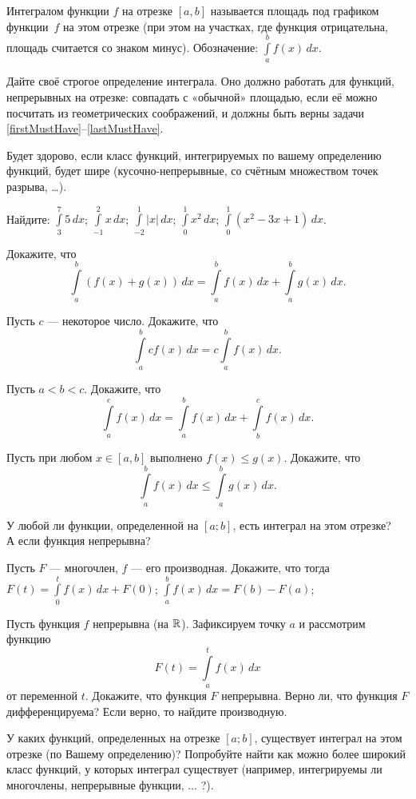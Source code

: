 \documentclass[a4paper,12pt]{article}
\newcommand{\intab}{\int\limits_a^b}
\begin{document}

Интегралом функции $f$ на отрезке $[a,b]$
называется площадь под графиком функции~$f$ на этом отрезке
(при этом на участках, где функция отрицательна, площадь
считается со знаком  минус).
Обозначение: $\int\limits_{a}^{b} f(x)\,dx$.

Дайте своё строгое определение интеграла.
Оно должно работать для функций, непрерывных на отрезке: 
совпадать с «обычной» площадью, если её можно посчитать из геометрических соображений, и должны быть верны задачи \ref{firstMustHave}--\ref{lastMustHave}.

Будет здорово, если класс функций, интегрируемых по вашему определению функций, будет шире (кусочно-непрерывные, со счётным множеством точек разрыва, \dots).

Найдите:
$\displaystyle\int\limits_{3}^{7} 5\,dx$;
$\displaystyle\int\limits_{-1}^{2} x\,dx$;
$\displaystyle\int\limits_{-2}^{1} |x|\,dx$;
$\displaystyle\int\limits_{0}^{1} x^2\,dx$;
$\displaystyle\int\limits_{0}^{1} (x^2-3x+1)\,dx$.


\label{firstMustHave}
Докажите, что
$$
\int\limits_a^b(f(x)+g(x))\,dx=
\int\limits_a^bf(x)\,dx+\int\limits_a^bg(x)\,dx.
$$

Пусть $c$ --- некоторое число.
Докажите, что
$$
\int\limits_a^bcf(x)\,dx  = c\int\limits_a^bf(x)\,dx.
$$

 Пусть  $a<b<c$. Докажите, что
$$
\int\limits_a^c f(x)\,dx=\int\limits_a^b f(x)\,dx+\int\limits_b^c f(x)\,dx.
$$


 Пусть при любом $x\in[a,b]$ выполнено $f(x)\le g(x)$.
Докажите, что
$$
\intab f(x)\,dx \le \intab g(x)\,dx.
$$

У любой ли функции, определенной на $[a;b]$, есть интеграл на этом
отрезке?\\
А если функция непрерывна?

\label{lastMustHave}
Пусть $F$ --- многочлен, $f$ --- его производная. Докажите,
что тогда\\
$F(t)=\int\limits_0^tf(x)\, dx+F(0)$;
$\int\limits_a^bf(x)\, dx=F(b)-F(a)$;

Пусть функция $f$ непрерывна (на $\mathbb{R}$). Зафиксируем точку $a$
и рассмотрим функцию $$F(t)=\int\limits_a^tf(x)\, dx$$ от переменной $t$.
Докажите, что функция $F$ непрерывна.
Верно ли, что функция $F$ дифференцируема?
Если верно, то найдите производную.

У каких функций, определенных на отрезке $[a;b]$, существует
интеграл на этом отрезке (по Вашему определению)?
Попробуйте найти как можно более широкий класс функций,
у которых интеграл существует (например, интегрируемы ли многочлены,
непрерывные функции, ... ?).


\end{document}
